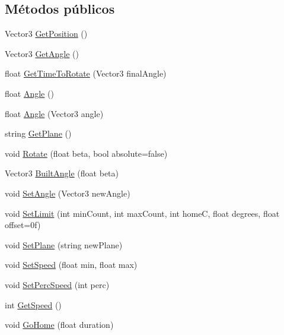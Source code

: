 \subsection*{Métodos públicos}
\begin{DoxyCompactItemize}
\item 
Vector3 \mbox{\hyperlink{class_articulation_a1a7ef254573e5d539a24d6ce58f93911}{Get\+Position}} ()
\item 
Vector3 \mbox{\hyperlink{class_articulation_af80ebaf44266ca6e4042b23d3a3392c9}{Get\+Angle}} ()
\item 
float \mbox{\hyperlink{class_articulation_a67d26d51e7a88fd6feea21cdd9f43db4}{Get\+Time\+To\+Rotate}} (Vector3 final\+Angle)
\item 
float \mbox{\hyperlink{class_articulation_a530b3282ef1e062b8a752eddb0f624f8}{Angle}} ()
\item 
float \mbox{\hyperlink{class_articulation_a778011e0e6155ccf305808d24cbbda64}{Angle}} (Vector3 angle)
\item 
string \mbox{\hyperlink{class_articulation_ac22a47cd879d9867137cf705070dfb7b}{Get\+Plane}} ()
\item 
void \mbox{\hyperlink{class_articulation_ae796d06441aa563bf7ccfce5f201c26e}{Rotate}} (float beta, bool absolute=false)
\item 
Vector3 \mbox{\hyperlink{class_articulation_a421283bcb0bc25871cb63e2664ecf296}{Built\+Angle}} (float beta)
\item 
void \mbox{\hyperlink{class_articulation_a5091b1cabb19fb26e8937857bf0a3ac5}{Set\+Angle}} (Vector3 new\+Angle)
\item 
void \mbox{\hyperlink{class_articulation_ab720697712b16b9ed195dd4ba34a01d4}{Set\+Limit}} (int min\+Count, int max\+Count, int homeC, float degrees, float offset=0f)
\item 
void \mbox{\hyperlink{class_articulation_abc1e52ec4c3370c2b8dd20b257c437ac}{Set\+Plane}} (string new\+Plane)
\item 
void \mbox{\hyperlink{class_articulation_a6522fc73e75eb5953305d51fcae10466}{Set\+Speed}} (float min, float max)
\item 
void \mbox{\hyperlink{class_articulation_a1674f771decad9bc252aa45edb116bb2}{Set\+Perc\+Speed}} (int perc)
\item 
int \mbox{\hyperlink{class_articulation_af125f382466f26db3296f90fb896fd5a}{Get\+Speed}} ()
\item 
void \mbox{\hyperlink{class_articulation_abe8a64163ae7fda2bcae5035ad1bfb75}{Go\+Home}} (float duration)
\item 

\end{DoxyCompactItemize}
